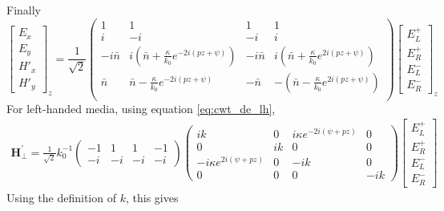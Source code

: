 Finally
\begin{equation}
\begin{bmatrix}
E_x\\E_y\\H'_x\\H'_y
\end{bmatrix}_z = \frac{1}{\sqrt{2}}\begin{pmatrix}
1 & 1 & 1 & 1\\
i &-i &-i & i\\
-i\bar{n} & i(\bar{n}+\frac{\kappa}{k_0}e^{-2i(pz+\psi)}) & -i\bar{n} & i(\bar{n}+\frac{\kappa}{k_0} e^{2i(pz+\psi)}) \\
\bar{n} & \bar{n}-\frac{\kappa}{k_0} e^{-2i(pz+\psi)} & -\bar{n} & -(\bar{n}-\frac{\kappa}{k_0} e^{2i(pz+\psi)}) \\
\end{pmatrix}\begin{bmatrix}
E_L^+\\E_R^+\\E_L^-\\E_R^-
\end{bmatrix}_z \label{eq:cwt_change_basis}
\end{equation}	
%
For left-handed media, using equation \ref{eq:cwt_de_lh},
\begin{eqnarray}
\mathbf{H_\perp^\prime} = \frac{1}{\sqrt{2}}k_0^{-1}\begin{pmatrix}-1 & 1 & 1 & -1\\-i & -i & -i & -i\end{pmatrix}\begin{pmatrix}
ik & 0 & i\kappa e^{-2i(\psi+pz)} & 0\\
0 & ik & 0 & 0\\
-i\kappa e^{2i(\psi + pz)} & 0 & -ik & 0\\
0 & 0 & 0 & -ik
\end{pmatrix}\begin{bmatrix}
E_L^+\\E_R^+\\E_L^-\\E_R^-
\end{bmatrix}
\end{eqnarray}
Using the definition of $k$, this gives
